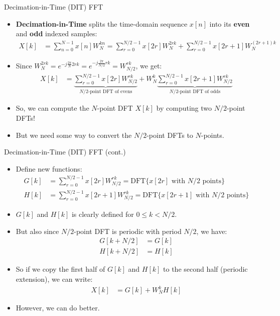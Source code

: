 \begin{frame}{Decimation-in-Time (DIT) FFT}
    \begin{itemize}
        \item \textbf{Decimation-in-Time} splits the time-domain sequence $x[n]$ into its \textbf{even} and \textbf{odd} indexed samples:
              \begin{align*}
                  X[k] & = \sum_{n=0}^{N-1} x[n]W_N^{kn} = \sum_{r=0}^{N/2-1} x[2r]W_N^{2rk} + \sum_{r=0}^{N/2-1} x[2r+1]W_N^{(2r+1)k}
              \end{align*}
        \item Since $W_N^{2rk} = e^{-j\frac{2\pi}{N}2rk} = e^{-j\frac{2\pi}{N/2}rk} = W_{N/2}^{rk}$, we get:
              \begin{align*}
                  X[k] & = \underbrace{\sum_{r=0}^{N/2-1} x[2r]W_{N/2}^{rk}}_{\text{$N/2$-point DFT of evens}} + W_N^k \underbrace{\sum_{r=0}^{N/2-1} x[2r+1]W_{N/2}^{rk}}_{\text{$N/2$-point DFT of odds}}
              \end{align*}
        \item So, we can compute the $N$-point DFT $X[k]$ by computing two $N/2$-point DFTs!
        \item But we need some way to convert the $N/2$-point DFTs to $N$-points.
    \end{itemize}
\end{frame}

\begin{frame}{Decimation-in-Time (DIT) FFT (cont.)}
    \begin{itemize}
        \item Define new functions:
              \begin{align*}
                  G[k] & = \sum_{r=0}^{N/2-1} x[2r]W_{N/2}^{rk} = \text{DFT}\{x[2r] \text{ with } N/2 \text{ points}\}     \\
                  H[k] & = \sum_{r=0}^{N/2-1} x[2r+1]W_{N/2}^{rk} = \text{DFT}\{x[2r+1] \text{ with } N/2 \text{ points}\}
              \end{align*}
        \item $G[k]$ and $H[k]$ is clearly defined for $0 \le k < N/2$.
        \item But also since $N/2$-point DFT is periodic with period $N/2$, we have:
              \begin{align*}
                  G[k + N/2] & = G[k] \\
                  H[k + N/2] & = H[k]
              \end{align*}

        \item So if we copy the first half of $G[k]$ and $H[k]$ to the second half (periodic extension), we can write:
              \begin{align*}
                  X[k] & = G[k] + W_N^k H[k]
              \end{align*}
        \item However, we can do better.
    \end{itemize}
\end{frame}

